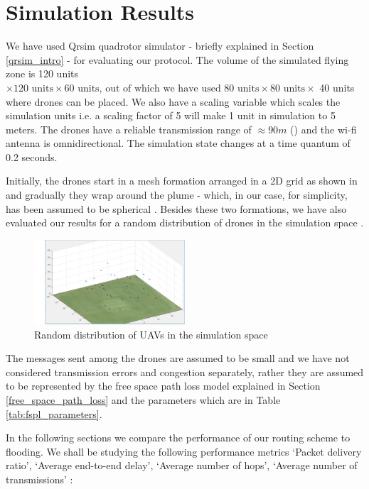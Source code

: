 \chapter{Simulation Results}
\newcommand\simResultFigSize{0.7}
\label{chap-five}

We have used Qrsim quadrotor simulator \cite{denardi2013rn} - briefly explained in Section \ref{qrsim_intro} - for evaluating our protocol. The volume of the simulated flying zone is 120 units $ \times \text{120 units} \times \text{60 units, out of which we have used 80 units} \times \text{80 units}\times $ 40 units where drones can be placed. We also have a scaling variable which scales the simulation units i.e. a scaling factor of 5 will make 1 unit in simulation to 5 meters. The drones have a reliable transmission range of $\approx 90 m$ () and the wi-fi antenna is omnidirectional. The simulation state changes at a time quantum of 0.2 seconds.

Initially, the drones start in a mesh formation arranged in a 2D grid as shown in  and gradually they wrap around the plume - which, in our case, for simplicity, has been assumed to be spherical . Besides these two formations, we have also evaluated our results for a random distribution of drones in the simulation space .

\begin{figure}[hbtp]
\centering
\includegraphics[width=0.5\textwidth]{ncsuthesis-0.6/Chapter-5/figs/random_drone_locations}
\caption{Random distribution of UAVs in the simulation space}
\label{fig:random_formation}
\end{figure}

The messages sent among the drones are assumed to be small and we have not considered transmission errors and congestion separately, rather they are assumed to be represented by the free space path loss model explained in Section \ref{free_space_path_loss} and the parameters which are in Table \ref{tab:fspl_parameters}. 

In the following sections we compare the performance of our routing scheme to flooding. We shall be studying the following performance metrics `Packet delivery ratio', `Average end-to-end delay', `Average number of hops', `Average number of transmissions' \cite{OUBBATI201729}:

